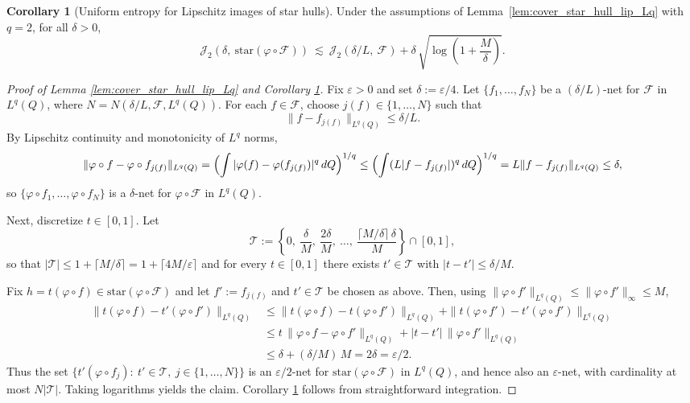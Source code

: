 \documentclass[11pt]{article}
\theoremstyle{plain}
\theoremstyle{definition} %
\newtheorem{corollary}{Corollary}
\begin{document}
\begin{corollary}[Uniform entropy for Lipschitz images of star hulls]
\label{cor:J2_star_hull_lip}
Under the assumptions of Lemma~\ref{lem:cover_star_hull_lip_Lq} with $q=2$, for all $\delta>0$,
\[
\mathcal J_2\left(\delta,\ \mathrm{star}(\varphi\circ\mathcal F)\right)
\ \lesssim\
\mathcal J_2\left(\delta/L,\ \mathcal F\right)
+
\delta\,\sqrt{\log\left(1+\frac{M}{\delta}\right)}.
\]
\end{corollary}



\begin{proof}[Proof of Lemma \ref{lem:cover_star_hull_lip_Lq} and Corollary \ref{cor:J2_star_hull_lip}]
Fix $\varepsilon>0$ and set $\delta:=\varepsilon/4$.
Let $\{f_1,\dots,f_N\}$ be a $(\delta/L)$-net for $\mathcal F$ in $L^q(Q)$, where
$N = N(\delta/L,\mathcal F,L^q(Q))$.
For each $f\in\mathcal F$, choose $j(f)\in\{1,\dots,N\}$ such that
\[
\|f-f_{j(f)}\|_{L^q(Q)}\le \delta/L.
\]
By Lipschitz continuity and monotonicity of $L^q$ norms,
\[
\|\varphi\circ f-\varphi\circ f_{j(f)}\|_{L^q(Q)}
=
\Bigl(\int |\varphi(f)-\varphi(f_{j(f)})|^q\,dQ\Bigr)^{1/q}
\le
\Bigl(\int (L|f-f_{j(f)}|)^q\,dQ\Bigr)^{1/q}
=
L\|f-f_{j(f)}\|_{L^q(Q)}
\le
\delta,
\]
so $\{\varphi\circ f_1,\dots,\varphi\circ f_N\}$ is a $\delta$-net for $\varphi\circ\mathcal F$ in $L^q(Q)$.

Next, discretize $t\in[0,1]$. Let
\[
\mathcal T
:=
\left\{0,\ \frac{\delta}{M},\ \frac{2\delta}{M},\ \dots,\ \frac{\lceil M/\delta\rceil\,\delta}{M}\right\}\cap[0,1],
\]
so that $|\mathcal T|\le 1+\lceil M/\delta\rceil = 1+\lceil 4M/\varepsilon\rceil$ and for every $t\in[0,1]$
there exists $t'\in\mathcal T$ with $|t-t'|\le \delta/M$.

Fix $h=t(\varphi\circ f)\in \mathrm{star}(\varphi\circ\mathcal F)$ and let $f':=f_{j(f)}$ and $t'\in\mathcal T$
be chosen as above. Then, using $\|\varphi\circ f'\|_{L^q(Q)}\le \|\varphi\circ f'\|_\infty\le M$,
\begin{align*}
\|t(\varphi\circ f)-t'(\varphi\circ f')\|_{L^q(Q)}
&\le
\|t(\varphi\circ f)-t(\varphi\circ f')\|_{L^q(Q)}
+
\|t(\varphi\circ f')-t'(\varphi\circ f')\|_{L^q(Q)}\\
&\le
t\,\|\varphi\circ f-\varphi\circ f'\|_{L^q(Q)}
+
|t-t'|\,\|\varphi\circ f'\|_{L^q(Q)}\\
&\le
\delta
+
(\delta/M)\,M
=
2\delta
=
\varepsilon/2.
\end{align*}
Thus the set $\{t'(\varphi\circ f_j):\ t'\in\mathcal T,\ j\in\{1,\dots,N\}\}$ is an $\varepsilon/2$-net for
$\mathrm{star}(\varphi\circ\mathcal F)$ in $L^q(Q)$, and hence also an $\varepsilon$-net, with cardinality at most $N|\mathcal T|$.
Taking logarithms yields the claim. Corollary \ref{cor:J2_star_hull_lip} follows from straightforward integration.
\end{proof}
\end{document}
